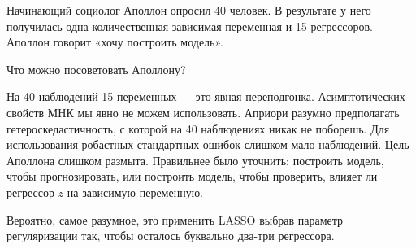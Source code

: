 \begin{problem}
Начинающий социолог Аполлон опросил 40 человек. 
В результате у него получилась одна количественная зависимая переменная и 15 регрессоров.
Аполлон говорит «хочу построить модель». 

Что можно посоветовать Аполлону?
\begin{sol}
На 40 наблюдений 15 переменных — это явная переподгонка. Асимптотических свойств МНК 
мы явно не можем использовать. Априори разумно предполагать гетероскедастичность, 
с которой на 40 наблюдениях никак не поборешь. Для использования робастных стандартных ошибок
слишком мало наблюдений. Цель Аполлона слишком размыта. Правильнее было уточнить:
построить модель, чтобы прогнозировать, или построить модель, чтобы проверить,
влияет ли регрессор $z$ на зависимую переменную. 

Вероятно, самое разумное, это применить LASSO выбрав параметр регуляризации так, 
чтобы осталось буквально два-три регрессора. 
\end{sol}
\end{problem}
  

